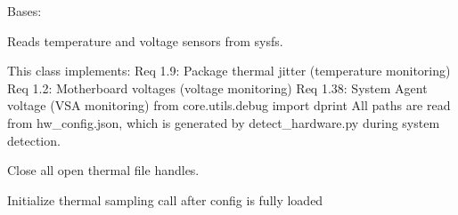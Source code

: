\documentclass[letterpaper,10pt,english]{sphinxmanual}
\begin{document}
\begin{fulllineitems}
\label{\detokenize{core.readers.sensor_reader:core.readers.sensor_reader.SensorReader}}
\pysigstartsignatures
\pysiglinewithargsret
{}
{}
{}
\pysigstopsignatures
\sphinxAtStartPar
Bases: 

\sphinxAtStartPar
Reads temperature and voltage sensors from sysfs.

\sphinxAtStartPar
This class implements:
\sphinxhyphen{} Req 1.9: Package thermal jitter (temperature monitoring)
\sphinxhyphen{} Req 1.2: Motherboard voltages (voltage monitoring)
\sphinxhyphen{} Req 1.38: System Agent voltage (VSA monitoring)
from core.utils.debug import dprint
All paths are read from hw\_config.json, which is generated by
detect\_hardware.py during system detection.

\begin{fulllineitems}
\label{\detokenize{core.readers.sensor_reader:core.readers.sensor_reader.SensorReader.close}}
\pysigstartsignatures
\pysiglinewithargsret
{}
{}
{}
\pysigstopsignatures
\sphinxAtStartPar
Close all open thermal file handles.

\end{fulllineitems}


\begin{fulllineitems}
\label{\detokenize{core.readers.sensor_reader:core.readers.sensor_reader.SensorReader.initialize}}
\pysigstartsignatures
\pysiglinewithargsret
{}
{}
{}
\pysigstopsignatures
\sphinxAtStartPar
Initialize thermal sampling \sphinxhyphen{} call after config is fully loaded

\end{fulllineitems}



\end{fulllineitems}
\end{document}
